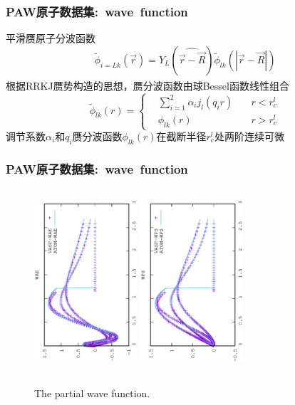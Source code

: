 \documentclass[cjk,slidestop,compress,mathserif,blue]{beamer}
\newcommand{\upcite}[1]{\hspace{0ex}\textsuperscript{\cite{#1}}} %
\begin{document}
\frame
{
	\frametitle{\textrm{PAW}原子数据集:~\textrm{wave~function}}
	平滑赝原子分波函数
	\begin{displaymath}
		\tilde\phi_{i=Lk}(\vec r)=Y_L(\widehat{\vec r-\vec R})\tilde\phi_{lk}(|\vec r-\vec R|)
	\end{displaymath}
	根据\textrm{RRKJ}赝势构造的思想，赝分波函数由球\textrm{Bessel}函数线性组合\upcite{JPCM6-8245_1994}
	\begin{displaymath}
		\tilde\phi_{lk}(r)=\left\{
		\begin{aligned}
			&\sum_{i=1}^2\alpha_ij_l(q_ir)\quad &r<r_c^l\\
			&\phi_{lk}(r)\quad&r>r_c^l
		\end{aligned}
		\right.
	\end{displaymath}
	调节系数$\alpha_i$和$q_i$赝分波函数$\phi_{lk}(r)$在截断半径$r_c^l$处两阶连续可微
}

\frame
{
	\frametitle{\textrm{PAW}原子数据集:~\textrm{wave~function}}
\begin{figure}[h!]
\centering
\vskip -0.5in
\includegraphics[width=1.5in,height=2.7in,viewport=0 0 350 550, angle=-90, clip]{Figures/WAE_data.eps}
\vskip -0.2in
\includegraphics[height=2.7in,width=1.5in,viewport=0 0 350 550, angle=-90, clip]{Figures/WPS_data.eps}
\caption{\tiny \textrm{The partial wave function.}}%
\label{Wave_Function}
\end{figure}
}
\end{document}

